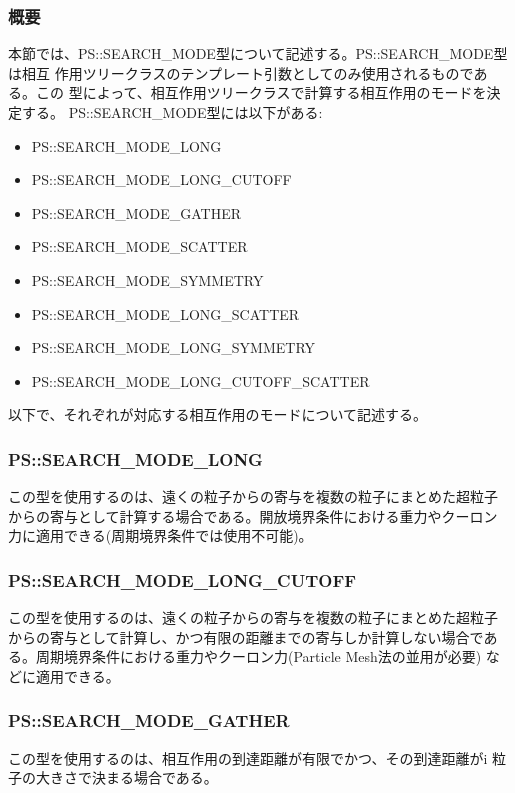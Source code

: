\subsubsection{概要}

本節では、PS::SEARCH\_MODE型について記述する。PS::SEARCH\_MODE型は相互
作用ツリークラスのテンプレート引数としてのみ使用されるものである。この
型によって、相互作用ツリークラスで計算する相互作用のモードを決定する。
PS::SEARCH\_MODE型には以下がある:
\begin{itemize}[leftmargin=*,itemsep=-1ex]
\item PS::SEARCH\_MODE\_LONG
\item PS::SEARCH\_MODE\_LONG\_CUTOFF
\item PS::SEARCH\_MODE\_GATHER
\item PS::SEARCH\_MODE\_SCATTER
\item PS::SEARCH\_MODE\_SYMMETRY
\item PS::SEARCH\_MODE\_LONG\_SCATTER
\item PS::SEARCH\_MODE\_LONG\_SYMMETRY
\item PS::SEARCH\_MODE\_LONG\_CUTOFF\_SCATTER
\end{itemize}
以下で、それぞれが対応する相互作用のモードについて記述する。

\subsubsection{PS::SEARCH\_MODE\_LONG}

この型を使用するのは、遠くの粒子からの寄与を複数の粒子にまとめた超粒子
からの寄与として計算する場合である。開放境界条件における重力やクーロン
力に適用できる(周期境界条件では使用不可能)。

\subsubsection{PS::SEARCH\_MODE\_LONG\_CUTOFF}

この型を使用するのは、遠くの粒子からの寄与を複数の粒子にまとめた超粒子
からの寄与として計算し、かつ有限の距離までの寄与しか計算しない場合であ
る。周期境界条件における重力やクーロン力(Particle Mesh法の並用が必要)
などに適用できる。

\subsubsection{PS::SEARCH\_MODE\_GATHER}

この型を使用するのは、相互作用の到達距離が有限でかつ、その到達距離がi
粒子の大きさで決まる場合である。

